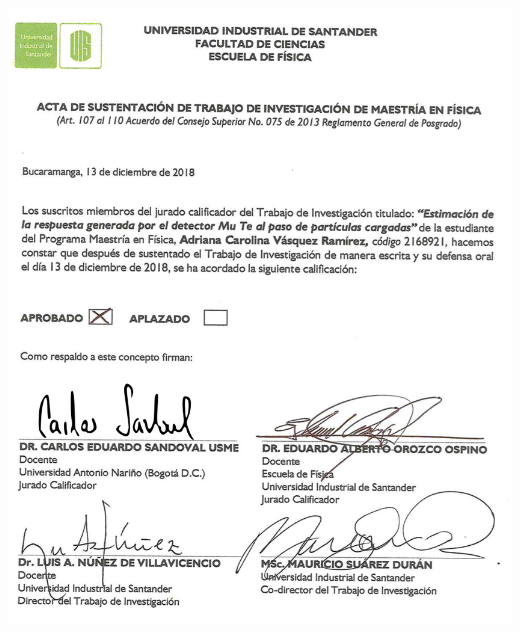 \documentclass[12pt,oneside,openany,letter]{book}
\begin{document}
\includegraphics[scale=1]{images/ACTA.png}
\newpage
\end{document}
